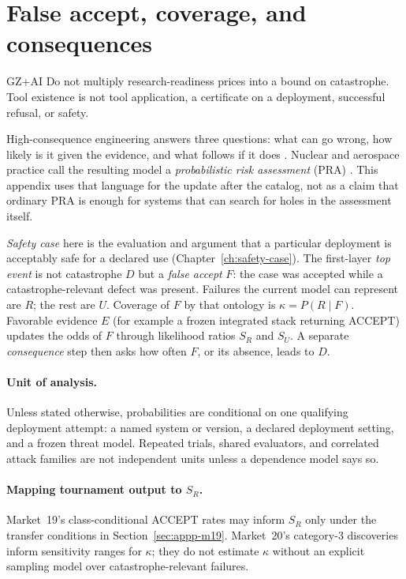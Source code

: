\section{False accept, coverage, and consequences}
\label{sec:appp-assurance}
\begin{authbar}{GZ+AI}
Do not multiply research-readiness prices into a bound on catastrophe.
Tool existence is not tool application, a certificate on a deployment, successful refusal, or safety.

High-consequence engineering answers three questions: what can go wrong, how likely is it given the evidence, and what follows if it does \autocite{kaplan1981risk}.
Nuclear and aerospace practice call the resulting model a \emph{probabilistic risk assessment} (PRA) \autocite{nrcPRA}.
This appendix uses that language for the update after the catalog, not as a claim that ordinary PRA is enough for systems that can search for holes in the assessment itself.

\emph{Safety case} here is the evaluation and argument that a particular deployment is acceptably safe for a declared use (Chapter~\ref{ch:safety-case}).
The first-layer \emph{top event} is not catastrophe $D$ but a \emph{false accept} $F$: the case was accepted while a catastrophe-relevant defect was present.
Failures the current model can represent are $R$; the rest are $U$.
Coverage of $F$ by that ontology is $\kappa = P(R\mid F)$.
Favorable evidence $E$ (for example a frozen integrated stack returning ACCEPT) updates the odds of $F$ through likelihood ratios $S_R$ and $S_U$.
A separate \emph{consequence} step then asks how often $F$, or its absence, leads to $D$.

\paragraph{Unit of analysis.}
Unless stated otherwise, probabilities are conditional on one qualifying deployment attempt: a named system or version, a declared deployment setting, and a frozen threat model.
Repeated trials, shared evaluators, and correlated attack families are not independent units unless a dependence model says so.

\paragraph{Mapping tournament output to $S_R$.}
Market~19's class-conditional ACCEPT rates may inform $S_R$ only under the transfer conditions in Section~\ref{sec:appp-m19}.
Market~20's category-3 discoveries inform sensitivity ranges for $\kappa$; they do not estimate $\kappa$ without an explicit sampling model over catastrophe-relevant failures.


\end{authbar}
